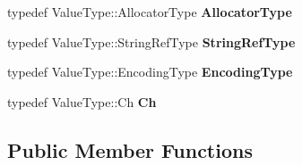 \begin{DoxyCompactItemize}
typedef Value\+Type\+::\+Allocator\+Type {\bfseries Allocator\+Type}
\item 
\mbox{\label{a02080_a9b8381fc96f5f89b2163b052ed66cc59}} 
typedef Value\+Type\+::\+String\+Ref\+Type {\bfseries String\+Ref\+Type}
\item 
\mbox{\label{a02080_a96ebfdde095e2ce42535d15ae5dc58ef}} 
typedef Value\+Type\+::\+Encoding\+Type {\bfseries Encoding\+Type}
\item 
\mbox{\label{a02080_ac6747e5baa13e15bcea1658b5624647a}} 
typedef Value\+Type\+::\+Ch {\bfseries Ch}
\end{DoxyCompactItemize}
\subsection*{Public Member Functions}
